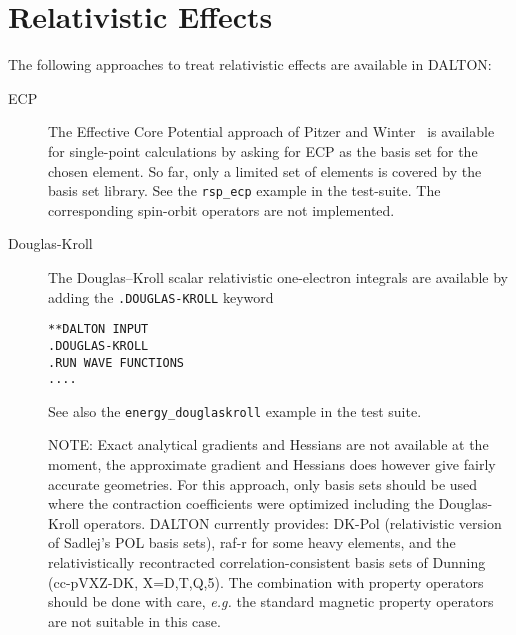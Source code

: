 \chapter{\label{chap:Relativity}Relativistic Effects}

The following approaches to treat relativistic effects are available in DALTON:

\begin{description}

\item[ECP]
The Effective Core Potential approach of Pitzer and
Winter~\cite{rmpnmwijqc40} is available for single-point calculations
by asking for ECP as the basis set for the chosen element. So far,
only a limited set of elements is covered by the basis set library. See
the \verb|rsp_ecp| example in the test-suite. The corresponding spin-orbit
operators are not implemented.

\begin{center}
\end{center}


\item[Douglas-Kroll] The Douglas--Kroll scalar relativistic one-electron integrals  
are available by adding the \verb|.DOUGLAS-KROLL|   keyword
\begin{verbatim}
**DALTON INPUT
.DOUGLAS-KROLL
.RUN WAVE FUNCTIONS
....
\end{verbatim}

See also the \verb|energy_douglaskroll| example in the test suite.

  NOTE: Exact analytical gradients and Hessians are not available 
at the moment, the approximate gradient and Hessians does however give fairly accurate geometries.  For this approach, only basis sets should be used 
where the contraction coefficients were optimized including the Douglas-Kroll 
operators. DALTON currently provides:  DK-Pol (relativistic version of Sadlej's POL basis sets), raf-r for some heavy elements, and the relativistically recontracted correlation-consistent basis sets of Dunning (cc-pVXZ-DK, X=D,T,Q,5). The combination with 
property operators should be done with care, {\it e.g.\/} the standard
magnetic property operators are not suitable in this case.


\end{description}
